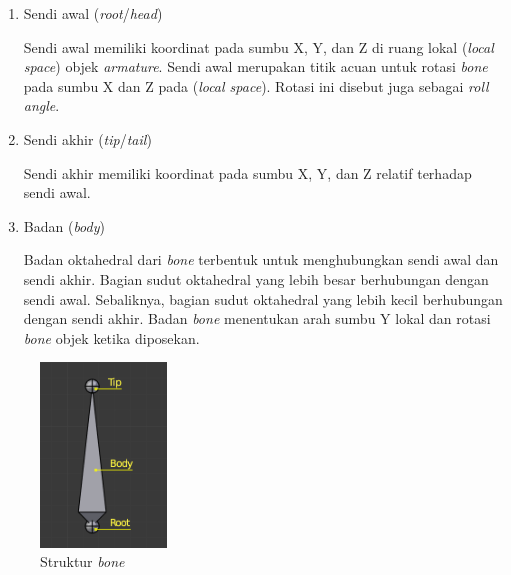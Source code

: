 \begin{enumerate}

    \item Sendi awal (\textit{root}/\textit{head})

    Sendi awal memiliki koordinat pada sumbu X, Y, dan Z di ruang lokal
    (\textit{local space}) objek \textit{armature}. Sendi awal merupakan titik
    acuan untuk rotasi \textit{bone} pada sumbu X dan Z pada (\textit{local
    space}). Rotasi ini disebut juga sebagai \textit{roll angle}.

    \item Sendi akhir (\textit{tip}/\textit{tail})

    Sendi akhir memiliki koordinat pada sumbu X, Y, dan Z relatif terhadap sendi
    awal.

    \item Badan (\textit{body})

    Badan oktahedral dari \textit{bone} terbentuk untuk menghubungkan sendi awal
    dan sendi akhir. Bagian sudut oktahedral yang lebih besar berhubungan
    dengan sendi awal. Sebaliknya, bagian sudut oktahedral yang lebih kecil
    berhubungan dengan sendi akhir. Badan \textit{bone} menentukan arah sumbu Y
    lokal dan rotasi \textit{bone} objek ketika diposekan.

\end{enumerate}

\begin{figure}[ht]
    \centering
    \includegraphics[width=0.3\textwidth]{resources/chapter-2-bone-structure.png}
    \caption{Struktur \textit{bone} \parencite{blender-bones-structure}}
    \label{fig:bone-structure}
\end{figure}


